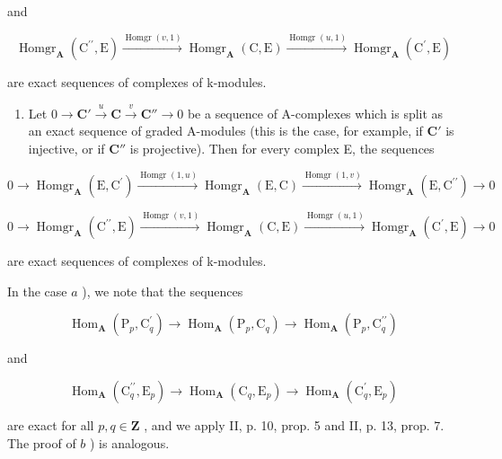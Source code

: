 and

\[
\operatorname{Homgr} _ {\mathbf {A}} \left(\mathrm{C} ^ {\prime \prime}, \mathrm{E}\right) \xrightarrow {\operatorname{Homgr} (v , 1)} \operatorname{Homgr} _ {\mathbf {A}} (\mathrm{C}, \mathrm{E}) \xrightarrow {\operatorname{Homgr} (u , 1)} \operatorname{Homgr} _ {\mathbf {A}} \left(\mathrm{C} ^ {\prime}, \mathrm{E}\right)
\]

are exact sequences of complexes of k-modules.

\begin{enumerate}
\def\labelenumi{\alph{enumi})}
\setcounter{enumi}{1}
\tightlist
\item
  Let \(0 \to \mathbf{C}' \xrightarrow{u} \mathbf{C} \xrightarrow{v} \mathbf{C}'' \to 0\) be a sequence of A-complexes which is split as an exact sequence of graded A-modules (this is the case, for example, if \(\mathbf{C}'\) is injective, or if \(\mathbf{C}''\) is projective). Then for every complex E, the sequences
\end{enumerate}

\[
0 \rightarrow \operatorname{Homgr} _ {\mathbf {A}} (\mathrm{E}, \mathrm{C} ^ {\prime}) \xrightarrow {\operatorname{Homgr} (1 , u)} \operatorname{Homgr} _ {\mathbf {A}} (\mathrm{E}, \mathrm{C}) \xrightarrow {\operatorname{Homgr} (1 , v)} \operatorname{Homgr} _ {\mathbf {A}} (\mathrm{E}, \mathrm{C} ^ {\prime \prime}) \rightarrow 0
\]

\[
0 \rightarrow \operatorname{Homgr} _ {\mathbf {A}} \left(\mathrm{C} ^ {\prime \prime}, \mathrm{E}\right) \xrightarrow {\operatorname{Homgr} (v , 1)} \operatorname{Homgr} _ {\mathbf {A}} (\mathrm{C}, \mathrm{E}) \xrightarrow {\operatorname{Homgr} (u , 1)} \operatorname{Homgr} _ {\mathbf {A}} \left(\mathrm{C} ^ {\prime}, \mathrm{E}\right)\rightarrow 0
\]

are exact sequences of complexes of k-modules.

In the case \(a\) ), we note that the sequences

\[
\operatorname{Hom} _ {\mathbf {A}} \left(\mathrm{P} _ {p}, \mathrm{C} _ {q} ^ {\prime}\right)\rightarrow \operatorname{Hom} _ {\mathbf {A}} \left(\mathrm{P} _ {p}, \mathrm{C} _ {q}\right)\rightarrow \operatorname{Hom} _ {\mathbf {A}} \left(\mathrm{P} _ {p}, \mathrm{C} _ {q} ^ {\prime \prime}\right)
\]

and

\[
\operatorname{Hom} _ {\mathbf {A}} \left(\mathrm{C} _ {q} ^ {\prime \prime}, \mathrm{E} _ {p}\right)\rightarrow \operatorname{Hom} _ {\mathbf {A}} \left(\mathrm{C} _ {q}, \mathrm{E} _ {p}\right)\rightarrow \operatorname{Hom} _ {\mathbf {A}} \left(\mathrm{C} _ {q} ^ {\prime}, \mathrm{E} _ {p}\right)
\]

are exact for all \(p, q \in \mathbf{Z}\) , and we apply II, p. 10, prop. 5 and II, p. 13, prop. 7. The proof of \(b\) ) is analogous.

